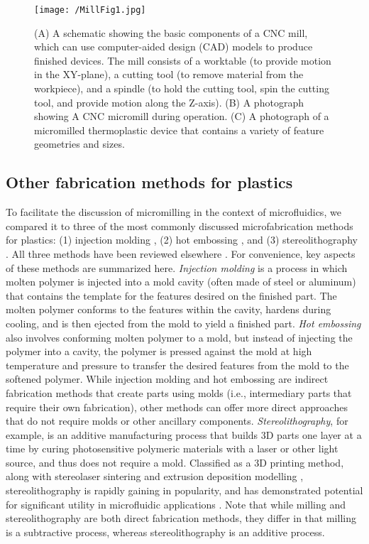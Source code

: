 \begin{figure}[ht] %
\centering
\texttt{[image: /MillFig1.jpg]}
\caption{(A) A schematic showing the basic components of a CNC mill, which can use computer-aided design (CAD) models to produce finished devices. The mill consists of a worktable (to provide motion in the XY-plane), a cutting tool (to remove material from the workpiece), and a spindle (to hold the cutting tool, spin the cutting tool, and provide motion along the Z-axis). (B) A photograph showing A CNC micromill during operation. (C) A photograph of a micromilled thermoplastic device that contains a variety of feature geometries and sizes.}
\label{figure:MillFig1}
\end{figure}

\subsection{Other fabrication methods for plastics}
To facilitate the discussion of micromilling in the context of microfluidics, we compared it to three of the most commonly discussed microfabrication methods for plastics: (1) injection molding \cite{Attia2009, Tanzi2013}, (2) hot embossing \cite{Becker2000a, Abgrall2007}, and (3) stereolithography \cite{Waldbaur2011, Au2014}. All three methods have been reviewed elsewhere \cite{Melchels2010}. For convenience, key aspects of these methods are summarized here.
\textit{Injection molding} is a process in which molten polymer is injected into a mold cavity (often made of steel or aluminum) that contains the template for the features desired on the finished part. The molten polymer conforms to the features within the cavity, hardens during cooling, and is then ejected from the mold to yield a finished part. \textit{Hot embossing} also involves conforming molten polymer to a mold, but instead of injecting the polymer into a cavity, the polymer is pressed against the mold at high temperature and pressure to transfer the desired features from the mold to the softened polymer. While injection molding and hot embossing are indirect fabrication methods that create parts using molds (i.e., intermediary parts that require their own fabrication), other methods can offer more direct approaches that do not require molds or other ancillary components. \textit{Stereolithography}, for example, is an additive manufacturing process that builds 3D parts one layer at a time by curing photosensitive polymeric materials with a laser or other light source, and thus does not require a mold. Classified as a 3D printing method, along with stereolaser sintering and extrusion deposition modelling \cite{Waldbaur2011}, stereolithography is rapidly gaining in popularity, and has demonstrated potential for significant utility in microfluidic applications \cite{Au2014,Morimoto2009, Bhargava2014}. Note that while milling and stereolithography are both direct fabrication methods, they differ in that milling is a subtractive process, whereas stereolithography is an additive process.

